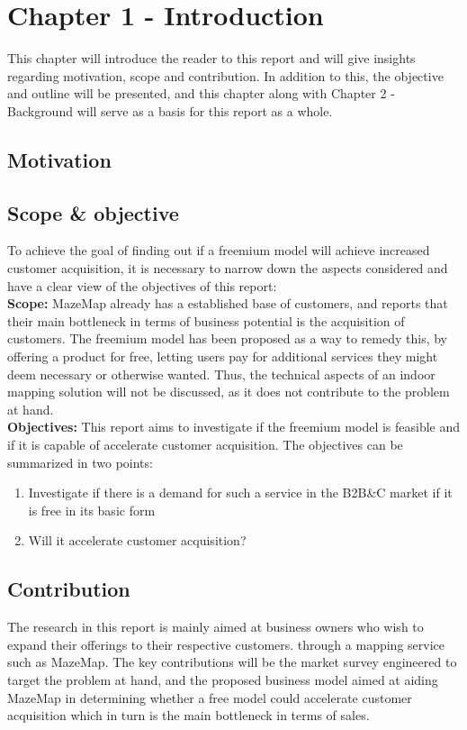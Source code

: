 \chapter{Chapter 1 - Introduction}
This chapter will introduce the reader to this report and will give insights regarding motivation, scope and contribution. In addition to this, the objective and outline will be presented, and this chapter along with Chapter 2 - Background will serve as a basis for this report as a whole.
\section {Motivation}

\section {Scope \& objective}
To achieve the goal of finding out if a freemium model will achieve increased customer acquisition, it is necessary to narrow down the aspects considered and have a clear view of the objectives of this report:
\newline
\\
\textbf{Scope: }MazeMap already has a established base of customers, and reports that their main bottleneck in terms of business potential is the acquisition of customers. The freemium model has been proposed as a way to remedy this, by offering a product for free, letting users pay for additional services they might deem necessary or otherwise wanted. Thus, the technical aspects of an indoor mapping solution will not be discussed, as it does not contribute to the problem at hand. 
\newline
\\
\textbf{Objectives: }This report aims to investigate if the freemium model is feasible and if it is capable of accelerate customer acquisition. The objectives can be summarized in two points:
\begin{enumerate}
\item Investigate if there is a demand for such a service in the B2B\&C market if it is free in its basic form
\item Will it accelerate customer acquisition?
\end{enumerate}
\section {Contribution}
The research in this report is mainly aimed at business owners who wish to expand their offerings to their respective customers. through a mapping service such as MazeMap. The key contributions will be the market survey engineered to target the problem at hand, and the proposed business model aimed at aiding MazeMap in determining whether a free model could accelerate customer acquisition which in turn is the main bottleneck in terms of sales.
